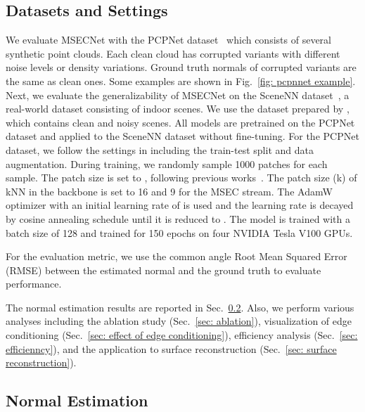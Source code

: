\documentclass[sigconf]{acmart}
\begin{document}
\subsection{Datasets and Settings}

We evaluate MSECNet with the PCPNet dataset~\cite{guerrero2018pcpnet} which consists of several synthetic point clouds. 
Each clean cloud has corrupted variants with different noise levels or density variations. Ground truth normals of corrupted variants are the same as clean ones. Some examples are shown in Fig.~\ref{fig: pcpnnet example}. Next, we evaluate the generalizability of MSECNet on the SceneNN dataset~\cite{hua2016scenenn}, a real-world dataset consisting of indoor scenes. We use the dataset prepared by \cite{li2022hsurf}, which contains clean and noisy scenes. All models are pretrained on the PCPNet dataset and applied to the SceneNN dataset without fine-tuning. 
For the PCPNet dataset, we follow the settings in \cite{guerrero2018pcpnet} including the train-test split and data augmentation. During training, we randomly sample 1000 patches for each sample. The patch size is set to , following previous works~\cite{zhu2021adafit,li2022hsurf}. The patch size (k) of kNN in the backbone is set to 16 and 9 for the MSEC stream. 
The AdamW~\cite{loshchilov2018decoupled} optimizer with an initial learning rate of  is used and the learning rate is decayed by cosine annealing schedule until it is reduced to . The model is trained with a batch size of 128 and trained for 150 epochs on four NVIDIA Tesla V100 GPUs.

For the evaluation metric, we use the common angle Root Mean Squared Error (RMSE) between the estimated normal and the ground truth to evaluate performance.

The normal estimation results are reported in Sec.~\ref{sec: normal estimation}. Also, we perform various analyses including the ablation study (Sec.~\ref{sec: ablation}), visualization of edge conditioning (Sec.~\ref{sec: effect of edge conditioning}), efficiency analysis (Sec.~\ref{sec: efficienncy}), and the application to surface reconstruction (Sec.~\ref{sec: surface reconstruction}).



\subsection{Normal Estimation}\label{sec: normal estimation}
\end{document}
